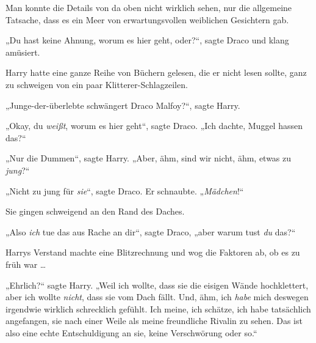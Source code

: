 \later

Man konnte die Details von da oben nicht wirklich sehen, nur die allgemeine Tatsache, dass es ein Meer von erwartungsvollen weiblichen Gesichtern gab.

„Du hast keine Ahnung, worum es hier geht, oder?“, sagte Draco und klang amüsiert.

Harry hatte eine ganze Reihe von Büchern gelesen, die er nicht lesen sollte, ganz zu schweigen von ein paar Klitterer-Schlagzeilen.

„Junge-der-überlebte schwängert Draco Malfoy?“, sagte Harry.

„Okay, du \emph{weißt}, worum es hier geht“, sagte Draco.
„Ich dachte, Muggel hassen das?“

„Nur die Dummen“, sagte Harry.
„Aber, ähm, sind wir nicht, ähm, etwas zu \emph{jung}?“

„Nicht zu jung für \emph{sie}“, sagte Draco. Er schnaubte.
„\emph{Mädchen}!“

Sie gingen schweigend an den Rand des Daches.

„Also \emph{ich} tue das aus Rache an dir“, sagte Draco, „aber warum tust \emph{du} das?“

Harrys Verstand machte eine Blitzrechnung und wog die Faktoren ab, ob es zu früh war …

„Ehrlich?“ sagte Harry.
„Weil ich wollte, dass sie die eisigen Wände hochklettert, aber ich wollte \emph{nicht}, dass sie vom Dach fällt. Und, ähm, ich \emph{habe} mich deswegen irgendwie wirklich schrecklich gefühlt. Ich meine, ich schätze, ich habe tatsächlich angefangen, sie nach einer Weile als meine freundliche Rivalin zu sehen. Das ist also eine echte Entschuldigung an sie, keine Verschwörung oder so.“

